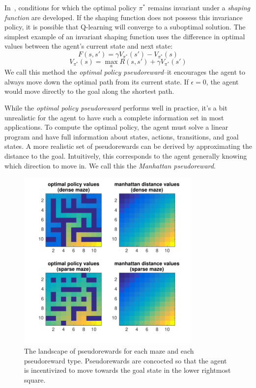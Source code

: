 \documentclass[notitlepage]{article}
\begin{document}
 In~\cite{ng1999policy}, conditions for which the optimal policy $\pi^*$ remains invariant under a \textit{shaping function} are developed. If the shaping function does not possess this invariance policy, it is possible that Q-learning will converge to a suboptimal solution. The simplest example of an invariant shaping function uses the difference in optimal values between the agent's current state and next state:
\begin{equation}
F(s, s') = \gamma V_{\pi^*}(s') - V_{\pi^*}(s) 
\end{equation}
\begin{equation}
V_{\pi^*}(s) =  \max_{a} R(s, s') + \gamma V_{\pi^*}(s')
\end{equation}
We call this method the \textit{optimal policy pseudoreward}--it encourages the agent to always move down the optimal path from its current state. If $\epsilon = 0$, the agent would move directly to the goal along the shortest path.

While the \textit{optimal policy pseudoreward} performs well in practice, it's a bit unrealistic for the agent to have such a complete information set in most applications. To compute the optimal policy, the agent must solve a linear program and have full information about states, actions, transitions, and goal states. A more realistic set of pseudorewards can be derived by approximating the distance to the goal. Intuitively, this corresponds to the agent generally knowing which direction to move in. We call this the \textit{Manhattan pseudoreward}.

\begin{figure}[ht]
\centering
\includegraphics[width=0.8\textwidth]{value_landscapes}
\caption{The landscape of pseudorewards for each maze and each pseudoreward type. Pseudorewards are concocted so that the agent is incentivized to move towards the goal state in the lower rightmost square.}
\label{fig:value-landscapes}
\end{figure}
\end{document}
